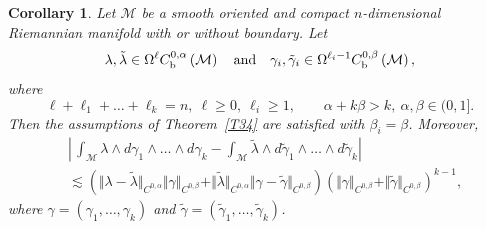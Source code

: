 \documentclass[intlimits,12pt,reqno]{amsart}
\newcommand{\cM}{\mathcal M}
\numberwithin{equation}{section}
\newtheorem{corollary}[theorem]{Corollary}
\theoremstyle{definition}
\begin{document}
\begin{corollary}
\label{T35}
Let $\cM$ be a smooth oriented and compact $n$-dimensional Riemannian manifold with or without boundary. Let
$$
\lambda,\tilde{\lambda}\in \Omega^\ell C_{\rm b}^{0,\alpha}\left(\cM\right)
\quad
\text{and}
\quad
\gamma_i,\tilde{\gamma}_i\in \Omega^{\ell_i-1}C_{\rm b}^{0,\beta}\left(\cM\right),
$$
where 
$$
\ell+\ell_1+\ldots+\ell_k=n,\
\ell\geq 0,\ \ell_i\geq 1, 
\qquad
\alpha+k\beta>k,\ \alpha,\beta\in (0,1].
$$
Then the assumptions of Theorem~\ref{T34} are satisfied with $\beta_i=\beta$.
Moreover, 
\begin{align*}
&\left|\,\int_{\cM}\lambda\wedge d\gamma_1\wedge\ldots\wedge d\gamma_k-\int_{\cM}\tilde{\lambda}\wedge d\tilde{\gamma}_1\wedge\ldots\wedge d\tilde{\gamma}_k\right|\\
&\lesssim    
\left(\Vert\lambda-\tilde{\lambda}\Vert_{C^{0,\alpha}}\Vert \gamma\Vert_{C^{0,\beta}}
+\Vert\tilde{\lambda}\Vert_{C^{0,\alpha}}\Vert \gamma-\tilde{\gamma}\Vert_{C^{0,\beta}}\right)
\left(\Vert \gamma\Vert_{C^{0,\beta}}+\Vert \tilde{\gamma}\Vert_{C^{0,\beta}}\right)^{k-1},
\end{align*}
where $\gamma=(\gamma_1,\ldots,\gamma_k)$ and $\tilde{\gamma}=(\tilde{\gamma}_1,\ldots,\tilde{\gamma}_k)$.
\end{corollary}
\end{document}
